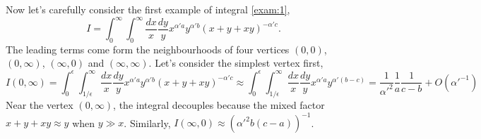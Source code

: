\documentclass[12pt]{article}
\theoremstyle{definition}
\theoremstyle{plain}
\begin{document}
Now let's carefully consider the first example of integral \eqref{exam:1},
\[
	I=\int_0^\infty \int_0^\infty\frac{dx}{x}\frac{dy}{y}x^{\alpha' a}y^{\alpha' b}(x+y+x y)^{-\alpha' c}.
\]
The leading terms come form the neighbourhoods of four vertices $(0,0)$, $(0,\infty)$, $(\infty,0)$ and $(\infty,\infty)$. Let's consider the simplest vertex first, 
\[
	I(0,\infty)=\int_{0}^\epsilon\int_{1/\epsilon}^\infty \frac{dx}{x}\frac{dy}{y}x^{\alpha' a}y^{\alpha' b}(x+y+xy)^{-\alpha' c}\approx \int_{0}^\epsilon\int_{1/\epsilon}^\infty \frac{dx}{x}\frac{dy}{y}x^{\alpha' a}y^{\alpha' (b-c)}= 
	\frac{1}{{\alpha'}^2}\frac{1}{a} \frac{1}{c-b}+O({\alpha'}^{-1})
\]
Near the vertex $(0,\infty)$, the integral decouples because the mixed factor $x+y+xy \approx y$ when $y \gg x$.  Similarly, $I(\infty,0)\approx ({\alpha'}^2 b (c-a))^{-1}$. 
\end{document}

